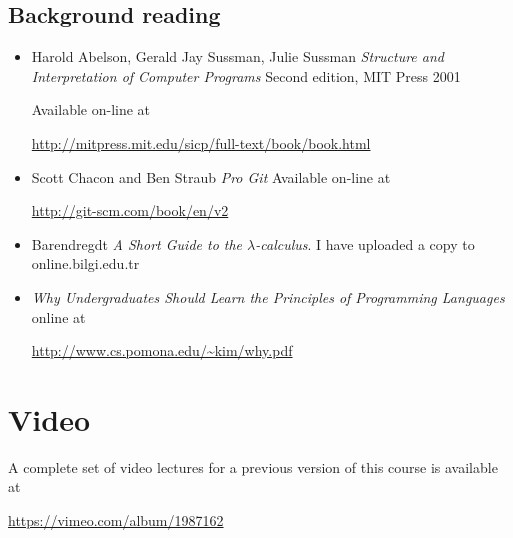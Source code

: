 \documentclass{article}
\begin{document}
\subsection*{Background reading}
\begin{itemize}

\item Harold Abelson, Gerald Jay Sussman, Julie Sussman 
\emph{Structure and Interpretation of Computer Programs}
Second edition, MIT Press 2001

Available on-line at 

\url{http://mitpress.mit.edu/sicp/full-text/book/book.html}

\item Scott Chacon and Ben Straub \emph{Pro Git}
Available on-line at 

\url{http://git-scm.com/book/en/v2}
\item Barendregdt \emph{A Short Guide to the $\lambda$-calculus}.  
I have uploaded a copy to online.bilgi.edu.tr

\item \emph{Why Undergraduates Should Learn the Principles of
Programming Languages} online at

\url{http://www.cs.pomona.edu/~kim/why.pdf}

\end{itemize}


\section*{Video}
A complete set of video lectures for a previous version of this course is available at

\url{https://vimeo.com/album/1987162}


\end{document}
